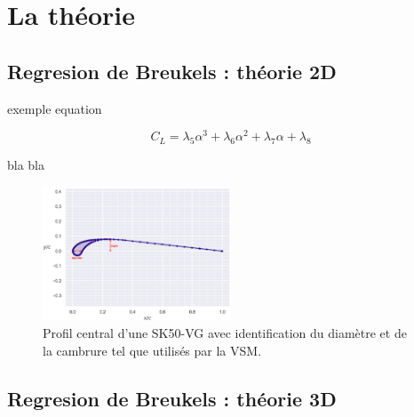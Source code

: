 \chapter{La théorie}
\label{ch:Ch1}

\section{\textbf{Regresion de Breukels : théorie 2D}} 
\label{sec:Ch1.1}

exemple equation
\begin{center}
    \begin{equation}
        C_L = \lambda_5  \alpha^3 +\lambda_6  \alpha^2 + \lambda_7  \alpha + \lambda_8
        \label{eq:Cl_breukels}
    \end{equation}
\end{center}


bla bla 

\begin{figure}[H]
    \centering
    \includegraphics[width=0.5\textwidth]{Pics/01 - Example/airfoil.png}  
    \caption{Profil central d'une SK50-VG avec identification du diamètre et de la cambrure tel que utilisés par la VSM.}
    \label{fig:airfoil}
\end{figure}

\section{\textbf{Regresion de Breukels : théorie 3D}} 
\label{sec:Ch1.2}